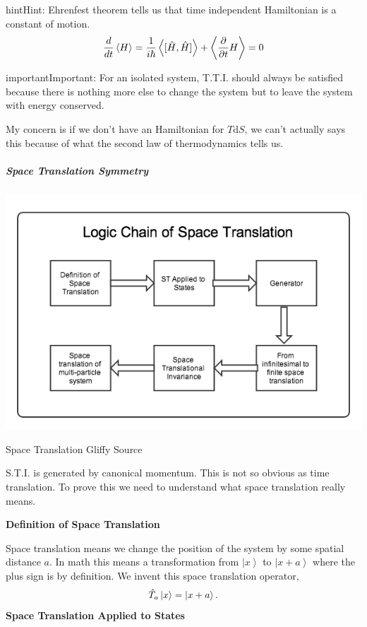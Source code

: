 \documentclass[letterpaper,10pt,english]{sphinxmanual}
\newcommand{\ket}[1]{\left| #1\right\rangle}
\newcommand{\avg}[1]{\left< #1 \right>}
\begin{document}
\begin{notice}{hint}{Hint:}
Ehrenfest theorem tells us that time independent Hamiltonian is a constant of motion.
\begin{gather}
\begin{split}\frac{d}{dt}\avg{H} = \frac{1}{i\hbar}\avg{[\hat H, \hat H]} + \avg{\frac{\partial}{\partial t} H } = 0\end{split}\notag
\end{gather}\end{notice}

\begin{notice}{important}{Important:}
For an isolated system, T.T.I. should always be satisfied because there is nothing more else to change the system but to leave the system with energy conserved.

My concern is if we don't have an Hamiltonian for \(T\mathrm d S\), we can't actually says this because of what the second law of thermodynamics tells us.
\end{notice}


\subparagraph{Space Translation Symmetry}
\label{Quantum/symmetries:space-translation-symmetry}
{\hfill\includegraphics{SpaceTranslation.png}\hfill}

Space Translation Gliffy Source

S.T.I. is generated by canonical momentum. This is not so obvious as time translation. To prove this we need to understand what space translation really means.

\textbf{Definition of Space Translation}

Space translation means we change the position of the system by some spatial distance \(a\). In math this means a transformation from \(\ket{x}\) to \(\ket{x+a}\) where the plus sign is by definition. We invent this space translation operator,
\begin{gather}
\begin{split}\hat T_a  \ket{x} = \ket{x + a} .\end{split}\notag
\end{gather}
\textbf{Space Translation Applied to States}
\end{document}
